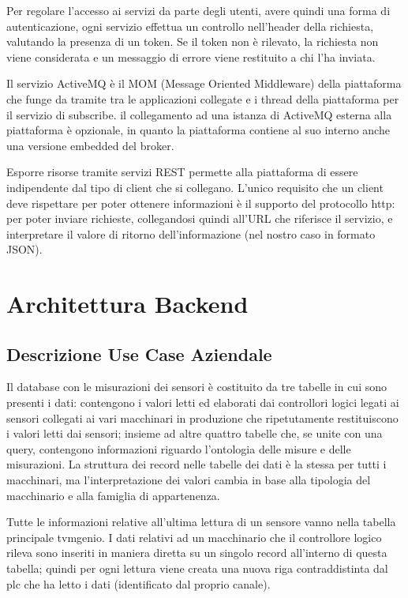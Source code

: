 Per regolare l’accesso ai servizi da parte degli utenti, avere quindi una forma di autenticazione, ogni servizio effettua un controllo nell'header della richiesta, valutando la presenza di un token. Se il token non è rilevato, la richiesta non viene considerata e un messaggio di errore viene restituito a chi l’ha inviata. \par
Il servizio ActiveMQ è il MOM (Message Oriented Middleware) della piattaforma che funge da tramite tra le applicazioni collegate e i thread della piattaforma per il servizio di subscribe. il collegamento ad una istanza di ActiveMQ esterna alla piattaforma è opzionale, in quanto la piattaforma contiene al suo interno anche una versione embedded del broker. 
\par
Esporre risorse tramite servizi REST permette alla piattaforma di essere indipendente dal tipo di client che si collegano. L’unico requisito che un client deve rispettare per poter ottenere informazioni è il supporto del protocollo http: per poter inviare richieste, collegandosi quindi all’URL che riferisce il servizio, e interpretare il valore di ritorno dell’informazione (nel nostro caso in formato JSON).
\clearpage
\section{Architettura Backend}
\subsection{Descrizione Use Case Aziendale}
Il database con le misurazioni dei sensori è costituito da tre tabelle in cui sono presenti i dati: contengono i valori letti ed elaborati dai controllori logici legati ai sensori collegati ai vari macchinari in produzione che ripetutamente restituiscono i valori letti dai sensori; insieme ad altre quattro tabelle che, se unite con una query, contengono informazioni riguardo l’ontologia delle misure e delle misurazioni. La struttura dei record nelle tabelle dei dati è la stessa per tutti i macchinari, ma l’interpretazione dei valori cambia in base alla tipologia del macchinario e alla famiglia di appartenenza.

Tutte le informazioni relative all’ultima lettura di un sensore vanno nella tabella principale tvmgenio. I dati relativi ad un macchinario che il controllore logico rileva sono inseriti in maniera diretta su un singolo record all’interno di questa tabella; quindi per ogni lettura viene creata una nuova riga contraddistinta dal plc che ha letto i dati (identificato dal proprio canale). 


